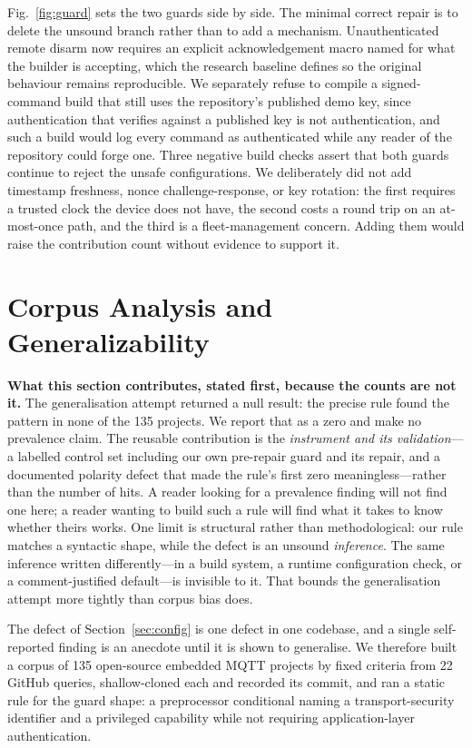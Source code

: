 Fig.~\ref{fig:guard} sets the two guards side by side. The minimal correct repair is to delete
the unsound branch rather than to add a mechanism.
Unauthenticated remote disarm now requires an explicit acknowledgement macro named for what the
builder is accepting, which the research baseline defines so the original behaviour remains
reproducible. We separately refuse to compile a signed-command build that still uses the
repository's published demo key, since authentication that verifies against a published key is
not authentication, and such a build would log every command as authenticated while any reader
of the repository could forge one. Three negative build checks assert that both guards continue
to reject the unsafe configurations. We deliberately did not add timestamp freshness, nonce
challenge-response, or key rotation: the first requires a trusted clock the device does not
have, the second costs a round trip on an at-most-once path, and the third is a fleet-management
concern. Adding them would raise the contribution count without evidence to support it.

\section{Corpus Analysis and Generalizability}
\label{sec:corpus}

\textbf{What this section contributes, stated first, because the counts are not it.} The
generalisation attempt returned a null result: the precise rule found the pattern in none of the
135 projects. We report that as a zero and make no prevalence claim. The reusable contribution is
the \emph{instrument and its validation}---a labelled control set including our own pre-repair
guard and its repair, and a documented polarity defect that made the rule's first zero
meaningless---rather than the number of hits. A reader looking for a prevalence finding will not
find one here; a reader wanting to build such a rule will find what it takes to know whether theirs
works. One limit is structural rather than methodological: our rule matches a syntactic shape,
while the defect is an unsound \emph{inference}. The same inference written differently---in a
build system, a runtime configuration check, or a comment-justified default---is invisible to it.
That bounds the generalisation attempt more tightly than corpus bias does.

The defect of Section~\ref{sec:config} is one defect in one codebase, and a single
self-reported finding is an anecdote until it is shown to generalise. We therefore built a
corpus of 135 open-source embedded MQTT projects by fixed criteria from 22 GitHub queries,
shallow-cloned each and recorded its commit, and ran a static rule for the guard shape: a
preprocessor conditional naming a transport-security identifier and a privileged capability
while not requiring application-layer authentication.

